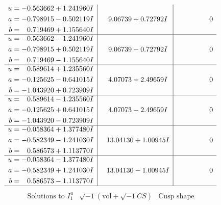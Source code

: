 \documentclass[1p]{elsarticle_modified}
\theoremstyle{definition}
\newcommand{\I}{\sqrt{-1}}
\begin{document}
$$\begin{array}{c|c|c}
\begin{aligned}
u &= -0.563662 + 1.241960 I \\
a &= -0.798915 - 0.502119 I \\
b &= \phantom{-}0.719469 + 1.155640 I\end{aligned}
 & \phantom{-}9.06739 + 0.72792 I & \phantom{-0.000000 } 0 \\ \hline\begin{aligned}
u &= -0.563662 - 1.241960 I \\
a &= -0.798915 + 0.502119 I \\
b &= \phantom{-}0.719469 - 1.155640 I\end{aligned}
 & \phantom{-}9.06739 - 0.72792 I & \phantom{-0.000000 } 0 \\ \hline\begin{aligned}
u &= \phantom{-}0.589614 + 1.235560 I \\
a &= -0.125625 - 0.641015 I \\
b &= -1.043920 + 0.723909 I\end{aligned}
 & \phantom{-}4.07073 + 2.49659 I & \phantom{-0.000000 } 0 \\ \hline\begin{aligned}
u &= \phantom{-}0.589614 - 1.235560 I \\
a &= -0.125625 + 0.641015 I \\
b &= -1.043920 - 0.723909 I\end{aligned}
 & \phantom{-}4.07073 - 2.49659 I & \phantom{-0.000000 } 0 \\ \hline\begin{aligned}
u &= -0.058364 + 1.377480 I \\
a &= -0.582349 - 1.241030 I \\
b &= \phantom{-}0.586573 + 1.113770 I\end{aligned}
 & \phantom{-}13.04130 + 1.00945 I & \phantom{-0.000000 } 0 \\ \hline\begin{aligned}
u &= -0.058364 - 1.377480 I \\
a &= -0.582349 + 1.241030 I \\
b &= \phantom{-}0.586573 - 1.113770 I\end{aligned}
 & \phantom{-}13.04130 - 1.00945 I & \phantom{-0.000000 } 0\\
 \hline 
 \end{array}$$\newpage$$\begin{array}{c|c|c}  
\text{Solutions to }I^u_{1}& \I (\text{vol} + \sqrt{-1}CS) & \text{Cusp shape}\\
 \hline 
\begin{aligned}

\end{aligned}
\end{array}$$
\end{document}

